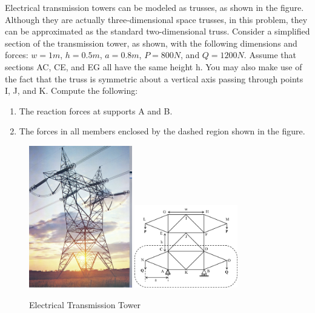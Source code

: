 
Electrical transmission towers can be modeled as trusses, as shown in the figure. Although they are actually three-dimensional space trusses, in this problem, they can be approximated as the standard two-dimensional truss. Consider a simplified section of the transmission tower, as shown, with the following dimensions and forces: $w = 1m$, $h = 0.5m$, $a = 0.8m$, $P = 800N$, and $Q = 1200N$. Assume that sections AC, CE, and EG all have the same height h. You may also make use of the fact that the truss is symmetric about a vertical axis passing through points I, J, and K. Compute the following:
\begin{enumerate}
  \item The reaction forces at supports A and B.
  \item The forces in all members enclosed by the dashed region shown in the figure.
\end{enumerate}

\begin{figure}[ht!]
  \centering
  \includegraphics[width=0.4\textwidth,
	           height=0.3\textheight,
		   keepaspectratio]{figa.png}
  \includegraphics[width=0.4\textwidth,
	           height=0.3\textheight,
		   keepaspectratio]{figb.png}
  \caption*{Electrical Transmission Tower}
\end{figure}


